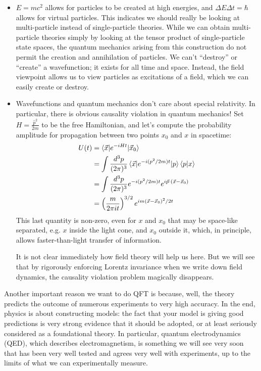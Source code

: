 \documentclass{report}
\theoremstyle{plain}
\theoremstyle{definition}
\theoremstyle{remark}
\newcommand{\FR}[2]{\frac{#1}{#2}}
\newcommand{\PFR}[2]{\left(\frac{#1}{#2}\right)}
\newcommand{\hp}{\hat p}
\begin{document}
\begin{itemize}
\item
  $E=mc^2$ allows for particles to be created at high energies, and
  $\Delta E \Delta t = \hbar$ allows for virtual particles. This
  indicates we should really be looking at multi-particle instead of
  single-particle theories. While we can obtain multi-particle
  theories simply by looking at the tensor product of single-particle
  state spaces, the quantum mechanics arising from this construction
  do not permit the creation and annihilation of particles. We can't
  ``destroy'' or ``create'' a wavefunction; it exists for all time and
  space. Instead, the field viewpoint allows us to view particles as
  excitations of a field, which we can easily create or destroy.
  
\item
  Wavefunctions and quantum mechanics don't care about special
  relativity. In particular, there is obvious causality violation in
  quantum mechanics! Set $H = \FR{\hp^2}{2m}$ to be the free
  Hamiltonian, and let's compute the probability amplitude for
  propagation between two points $x_0$ and $x$ in spacetime:
  \begin{align*}
    U(t) &= \braket{\vec x|e^{-iHt}|\vec x_0}\\ &= \int
    \FR{d^3p}{(2\pi)^3} \braket{\vec
      x|e^{-i(p^2/2m)t}|p}\braket{p|x}\\ &= \int \FR{d^3p}{(2\pi)^3}
    e^{-i(p^2/2m)t}e^{i\vec p\cdot (\vec x-\vec x_0)}\\ &=
    \PFR{m}{2\pi i t}^{3/2} e^{im(\vec x-\vec x_0)^2/2t}
  \end{align*}
  This last quantity is non-zero, even for $x$ and $x_0$ that may be
  space-like separated, e.g. $x$ inside the light cone, and $x_0$
  outside it, which, in principle, allows faster-than-light transfer
  of information.

  It is not clear immediately how field theory will help us here. But
  we will see that by rigorously enforcing Lorentz invariance when we
  write down field dynamics, the causality violation problem magically
  disappears.
\end{itemize}

Another important reason we want to do QFT is because, well, the
theory predicts the outcome of numerous experiments to very high
accuracy. In the end, physics is about constructing models: the fact
that your model is giving good predictions is very strong evidence
that it should be adopted, or at least seriously considered as a
foundational theory. In particular, quantum electrodynamics (QED),
which describes electromagnetism, is something we will see very soon
that has been very well tested and agrees very well with experiments,
up to the limits of what we can experimentally measure.
    
\end{document}
